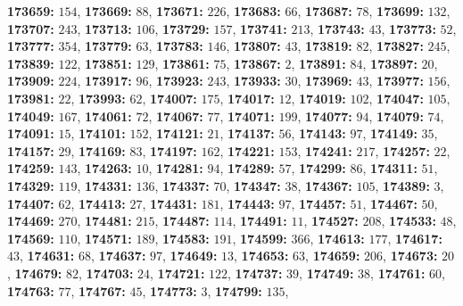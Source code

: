 \textsf{\bfseries 173659:} $154$, \textsf{\bfseries 173669:} $88$, \textsf{\bfseries 173671:} $226$, \textsf{\bfseries 173683:} $66$, \textsf{\bfseries 173687:} $78$, \textsf{\bfseries 173699:} $132$, \textsf{\bfseries 173707:} $243$, \textsf{\bfseries 173713:} $106$, \textsf{\bfseries 173729:} $157$, \textsf{\bfseries 173741:} $213$, \textsf{\bfseries 173743:} $43$, \textsf{\bfseries 173773:} $52$, \textsf{\bfseries 173777:} $354$, \textsf{\bfseries 173779:} $63$, \textsf{\bfseries 173783:} $146$, \textsf{\bfseries 173807:} $43$, \textsf{\bfseries 173819:} $82$, \textsf{\bfseries 173827:} $245$, \textsf{\bfseries 173839:} $122$, \textsf{\bfseries 173851:} $129$, \textsf{\bfseries 173861:} $75$, \textsf{\bfseries 173867:} $2$, \textsf{\bfseries 173891:} $84$, \textsf{\bfseries 173897:} $20$, \textsf{\bfseries 173909:} $224$, \textsf{\bfseries 173917:} $96$, \textsf{\bfseries 173923:} $243$, \textsf{\bfseries 173933:} $30$, \textsf{\bfseries 173969:} $43$, \textsf{\bfseries 173977:} $156$, \textsf{\bfseries 173981:} $22$, \textsf{\bfseries 173993:} $62$, \textsf{\bfseries 174007:} $175$, \textsf{\bfseries 174017:} $12$, \textsf{\bfseries 174019:} $102$, \textsf{\bfseries 174047:} $105$, \textsf{\bfseries 174049:} $167$, \textsf{\bfseries 174061:} $72$, \textsf{\bfseries 174067:} $77$, \textsf{\bfseries 174071:} $199$, \textsf{\bfseries 174077:} $94$, \textsf{\bfseries 174079:} $74$, \textsf{\bfseries 174091:} $15$, \textsf{\bfseries 174101:} $152$, \textsf{\bfseries 174121:} $21$, \textsf{\bfseries 174137:} $56$, \textsf{\bfseries 174143:} $97$, \textsf{\bfseries 174149:} $35$, \textsf{\bfseries 174157:} $29$, \textsf{\bfseries 174169:} $83$, \textsf{\bfseries 174197:} $162$, \textsf{\bfseries 174221:} $153$, \textsf{\bfseries 174241:} $217$, \textsf{\bfseries 174257:} $22$, \textsf{\bfseries 174259:} $143$, \textsf{\bfseries 174263:} $10$, \textsf{\bfseries 174281:} $94$, \textsf{\bfseries 174289:} $57$, \textsf{\bfseries 174299:} $86$, \textsf{\bfseries 174311:} $51$, \textsf{\bfseries 174329:} $119$, \textsf{\bfseries 174331:} $136$, \textsf{\bfseries 174337:} $70$, \textsf{\bfseries 174347:} $38$, \textsf{\bfseries 174367:} $105$, \textsf{\bfseries 174389:} $3$, \textsf{\bfseries 174407:} $62$, \textsf{\bfseries 174413:} $27$, \textsf{\bfseries 174431:} $181$, \textsf{\bfseries 174443:} $97$, \textsf{\bfseries 174457:} $51$, \textsf{\bfseries 174467:} $50$, \textsf{\bfseries 174469:} $270$, \textsf{\bfseries 174481:} $215$, \textsf{\bfseries 174487:} $114$, \textsf{\bfseries 174491:} $11$, \textsf{\bfseries 174527:} $208$, \textsf{\bfseries 174533:} $48$, \textsf{\bfseries 174569:} $110$, \textsf{\bfseries 174571:} $189$, \textsf{\bfseries 174583:} $191$, \textsf{\bfseries 174599:} $366$, \textsf{\bfseries 174613:} $177$, \textsf{\bfseries 174617:} $43$, \textsf{\bfseries 174631:} $68$, \textsf{\bfseries 174637:} $97$, \textsf{\bfseries 174649:} $13$, \textsf{\bfseries 174653:} $63$, \textsf{\bfseries 174659:} $206$, \textsf{\bfseries 174673:} $20$, \textsf{\bfseries 174679:} $82$, \textsf{\bfseries 174703:} $24$, \textsf{\bfseries 174721:} $122$, \textsf{\bfseries 174737:} $39$, \textsf{\bfseries 174749:} $38$, \textsf{\bfseries 174761:} $60$, \textsf{\bfseries 174763:} $77$, \textsf{\bfseries 174767:} $45$, \textsf{\bfseries 174773:} $3$, \textsf{\bfseries 174799:} $135$, 
